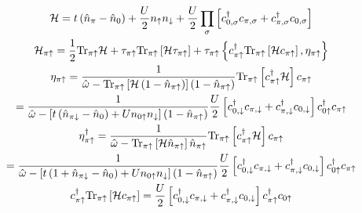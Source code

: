 \documentclass[14pt]{extarticle}
\begin{document}
\begin{gather}
\mathcal{H} = t\left({\hat n_{\pi}-\hat n_{0}}\right)+\frac{U}{2}n_{\uparrow} n_{\downarrow} + \frac{U}{2}\prod_\sigma \left[{c^\dagger_{0,\sigma}c_{\pi,\sigma}+c^\dagger_{\pi,\sigma}c_{0,\sigma}}\right]\\
\mathcal{H}_{\pi\uparrow} = \frac{1}{2}\text{Tr}_{\pi\uparrow}\mathcal{H} + \tau_{\pi\uparrow}\text{Tr}_{\pi\uparrow}\left[{\mathcal{H} \tau_{\pi\uparrow}}\right] + \tau_{\pi\uparrow}\left\{{c^\dagger_{\pi\uparrow}\text{Tr}_{\pi\uparrow}\left[{\mathcal{H} c_{\pi\uparrow}}\right],\eta_{\pi\uparrow}}\right\}\\
\eta_{\pi\uparrow} = \frac{1}{\hat \omega - \text{Tr}_{\pi\uparrow}\left[{\mathcal{H} \left({1-\hat n_{\pi\uparrow}}\right)}\right]\left({1-\hat n_{\pi\uparrow}}\right)}\text{Tr}_{\pi\uparrow}\left[{c_{\pi\uparrow}^\dagger\mathcal{H} }\right]c_{\pi\uparrow}\\
= \frac{1}{\hat \omega - \left[{t\left({\hat n_{\pi\downarrow}-\hat n_{0}}\right)+Un_{0\uparrow} n_{\downarrow}}\right]\left({1-\hat n_{\pi\uparrow}}\right)}\frac{U}{2}\left[{c^\dagger_{0,\downarrow}c_{\pi,\downarrow}+c^\dagger_{\pi,\downarrow}c_{0,\downarrow}}\right]c^\dagger_{0\uparrow}c_{\pi\uparrow}\\
\eta_{\pi\uparrow}^\dagger = \frac{1}{\hat \omega - \text{Tr}_{\pi\uparrow}\left[{\mathcal{H} \hat n_{\pi\uparrow}}\right]\hat n_{\pi\uparrow}}\text{Tr}_{\pi\uparrow}\left[{c_{\pi\uparrow}^\dagger\mathcal{H} }\right]c_{\pi\uparrow}\\
= \frac{1}{\hat \omega - \left[{t\left({1 + \hat n_{\pi\downarrow}-\hat n_{0}}\right)+Un_{0\uparrow} n_{\downarrow}}\right]\left({1-\hat n_{\pi\uparrow}}\right)}\frac{U}{2}\left[{c^\dagger_{0,\downarrow}c_{\pi,\downarrow}+c^\dagger_{\pi,\downarrow}c_{0,\downarrow}}\right]c^\dagger_{0\uparrow}c_{\pi\uparrow}\\
c^\dagger_{\pi\uparrow}\text{Tr}_{\pi\uparrow}\left[{\mathcal{H} c_{\pi\uparrow}}\right]= \frac{U}{2}\left[{c^\dagger_{0,\downarrow}c_{\pi,\downarrow}+c^\dagger_{\pi,\downarrow}c_{0,\downarrow}}\right]c^\dagger_{\pi\uparrow}c_{0\uparrow}
\end{gather}
\end{document}
